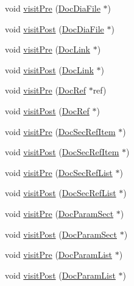 \begin{DoxyCompactItemize}
\item 
void \hyperlink{class_r_t_f_doc_visitor_a6d79133c9c09ce853523d3d916a4e740}{visit\+Pre} (\hyperlink{class_doc_dia_file}{Doc\+Dia\+File} $\ast$)
\item 
void \hyperlink{class_r_t_f_doc_visitor_aab2971f22751869666142440daf2a485}{visit\+Post} (\hyperlink{class_doc_dia_file}{Doc\+Dia\+File} $\ast$)
\item 
void \hyperlink{class_r_t_f_doc_visitor_a49ac2e4a437735a26ae7893a7025fa4f}{visit\+Pre} (\hyperlink{class_doc_link}{Doc\+Link} $\ast$)
\item 
void \hyperlink{class_r_t_f_doc_visitor_af29d43e966004f232bf215a5a4f5327f}{visit\+Post} (\hyperlink{class_doc_link}{Doc\+Link} $\ast$)
\item 
void \hyperlink{class_r_t_f_doc_visitor_a84cba806c1dd1311182eb6e995349731}{visit\+Pre} (\hyperlink{class_doc_ref}{Doc\+Ref} $\ast$ref)
\item 
void \hyperlink{class_r_t_f_doc_visitor_aae5aa2e028f7f9c2495ea210729a9f12}{visit\+Post} (\hyperlink{class_doc_ref}{Doc\+Ref} $\ast$)
\item 
void \hyperlink{class_r_t_f_doc_visitor_a2898034f0854e3793a036e04e4074d00}{visit\+Pre} (\hyperlink{class_doc_sec_ref_item}{Doc\+Sec\+Ref\+Item} $\ast$)
\item 
void \hyperlink{class_r_t_f_doc_visitor_a29936bdbef4780beb57bfcd34fde953e}{visit\+Post} (\hyperlink{class_doc_sec_ref_item}{Doc\+Sec\+Ref\+Item} $\ast$)
\item 
void \hyperlink{class_r_t_f_doc_visitor_a8c4e9007466e8b6cb49bb773d61e9d13}{visit\+Pre} (\hyperlink{class_doc_sec_ref_list}{Doc\+Sec\+Ref\+List} $\ast$)
\item 
void \hyperlink{class_r_t_f_doc_visitor_add125d0b44e7124059e8a2b90aea4703}{visit\+Post} (\hyperlink{class_doc_sec_ref_list}{Doc\+Sec\+Ref\+List} $\ast$)
\item 
void \hyperlink{class_r_t_f_doc_visitor_a4306bf8170d88d375b27fdda843afa38}{visit\+Pre} (\hyperlink{class_doc_param_sect}{Doc\+Param\+Sect} $\ast$)
\item 
void \hyperlink{class_r_t_f_doc_visitor_a1346482362efde03262d6c4d5977bd09}{visit\+Post} (\hyperlink{class_doc_param_sect}{Doc\+Param\+Sect} $\ast$)
\item 
void \hyperlink{class_r_t_f_doc_visitor_abf39296db915807caab4389f595b78b2}{visit\+Pre} (\hyperlink{class_doc_param_list}{Doc\+Param\+List} $\ast$)
\item 
void \hyperlink{class_r_t_f_doc_visitor_a905b5bed77ee7df43c3f653ae166c3cb}{visit\+Post} (\hyperlink{class_doc_param_list}{Doc\+Param\+List} $\ast$)

\end{DoxyCompactItemize}
